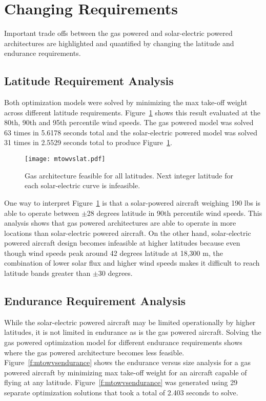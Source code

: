 


\normalsize

\section{Changing Requirements}

Important trade offs between the gas powered and solar-electric powered architectures are highlighted and quantified by changing the latitude and endurance requirements.   

\subsection{Latitude Requirement Analysis}

Both optimization models were solved by minimizing the max take-off weight across different latitude requirements. 
Figure~\ref{f:latvsmtowtrade} shows this result evaluated at the 80th, 90th and 95th percentile wind speeds.  
The gas powered model was solved 63 times in 5.6178 seconds total and the solar-electric powered model was solved 31 times in 2.5529 seconds total to produce Figure~\ref{f:latvsmtowtrade}.

\begin{figure}[h!]
	\begin{center}
	\texttt{[image: mtowvslat.pdf]}
    \caption{Gas architecture feasible for all latitudes. Next integer latitude for each solar-electric curve is infeasible.}
    \label{f:latvsmtowtrade}
	\end{center}
\end{figure}

One way to interpret Figure~\ref{f:latvsmtowtrade} is that a solar-powered aircraft weighing 190 lbs is able to operate between $\pm$28 degrees latitude in 90th percentile wind speeds.  
This analysis shows that gas powered architectures are able to operate in more locations than solar-electric powered aircraft.  
On the other hand, solar-electric powered aircraft design becomes infeasible at higher latitudes because even though wind speeds peak around 42 degrees latitude at 18,300 m, the combination of lower solar flux and higher wind speeds makes it difficult to reach latitude bands greater than $\pm$30 degrees. 

\subsection{Endurance Requirement Analysis}
While the solar-electric powered aircraft may be limited operationally by higher latitudes, it is not limited in endurance as is the gas powered aircraft.
Solving the gas powered optimization model for different endurance requirements shows where the gas powered architecture becomes less feasible. 
Figure~\ref{f:mtowvsendurance} shows the endurance versus size analysis for a gas powered aircraft by minimizing max take-off weight for an aircraft capable of flying at any latitude. 
Figure~\ref{f:mtowvsendurance} was generated using 29 separate optimization solutions that took a total of 2.403 seconds to solve.


